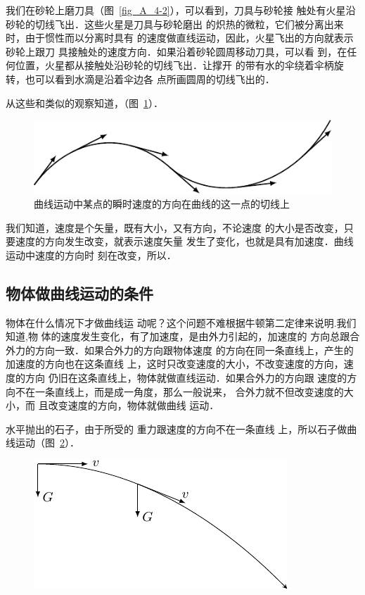     我们在砂轮上磨刀具（图~\ref{fig_A_4-2}），可以看到，刀具与砂轮接
触处有火星沿砂轮的切线飞出．这些火星是刀具与砂轮磨出
的炽热的微粒，它们被分离出来时，由于惯性而以分离时具有
的速度做直线运动，因此，火星飞出的方向就表示砂轮上跟刀
具接触处的速度方向．如果沿着砂轮圆周移动刀具，可以看
到，在任何位置，火星都从接触处沿砂轮的切线飞出．让撑开
的带有水的伞绕着伞柄旋转，也可以看到水滴是沿着伞边各
点所画圆周的切线飞出的．

从这些和类似的观察知道，（图~\ref{fig_A_4-3}）．

\begin{figure}[htbp]
    \centering
    \includegraphics{fig/A/4-3.pdf}
    \caption{曲线运动中某点的瞬时速度的方向在曲线的这一点的切线上}\label{fig_A_4-3}
\end{figure}

我们知道，速度是个矢量，既有大小，又有方向，不论速度
的大小是否改变，只要速度的方向发生改变，就表示速度矢量
发生了变化，也就是具有加速度．曲线运动中速度的方向时
刻在改变，所以．

\subsection{物体做曲线运动的条件}

物体在什么情况下才做曲线运
动呢？这个问题不难根据牛顿第二定律来说明.我们知道,物
体的速度发生变化，有了加速度，是由外力引起的，加速度的
方向总跟合外力的方向一致．如果合外力的方向跟物体速度
的方向在同一条直线上，产生的加速度的方向也在这条直线
上，这时只改变速度的大小，不改变速度的方向，速度的方向
仍旧在这条直线上，物体就做直线运动．如果合外力的方向跟
速度的方向不在一条直线上，而是成一角度，那么一般说来，
合外力就不但改变速度的大小，而
且改变速度的方向，物体就做曲线
运动．

    水平抛出的石子，由于所受的
重力跟速度的方向不在一条直线
上，所以石子做曲线运动（图~\ref{fig_A_4-4}）．

\begin{figure}[htbp]
    \centering
    \includegraphics{fig/A/4-4.pdf}
    \caption{}\label{fig_A_4-4}
\end{figure}
 
